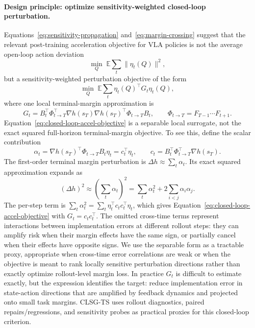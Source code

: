 \documentclass[10pt]{article}
\begin{document}
\paragraph{Design principle: optimize sensitivity-weighted closed-loop perturbation.}
Equations~\ref{eq:sensitivity-propagation} and~\ref{eq:margin-crossing} suggest that the relevant post-training acceleration objective for VLA policies is not the average open-loop action deviation
\begin{equation}
    \min_Q \; \mathbb{E}\sum_t \|\eta_t(Q)\|^2 ,
    \label{eq:open-loop-accel-objective}
\end{equation}
but a sensitivity-weighted perturbation objective of the form
\begin{equation}
    \min_Q \; \mathbb{E}\sum_t \eta_t(Q)^\top G_t \eta_t(Q),
    \label{eq:closed-loop-accel-objective}
\end{equation}
where one local terminal-margin approximation is
\begin{equation}
    G_t =
    B_t^\top \Phi_{t\to T}^\top
    \nabla h(s_T)\nabla h(s_T)^\top
    \Phi_{t\to T} B_t ,
    \qquad
    \Phi_{t\to T}=F_{T-1}\cdots F_{t+1}.
    \label{eq:sensitivity-metric}
\end{equation}
Equation~\ref{eq:closed-loop-accel-objective} is a separable local surrogate, not the exact squared full-horizon terminal-margin objective. To see this, define the scalar contribution
\[
    \alpha_t =
    \nabla h(s_T)^\top \Phi_{t\to T}B_t\eta_t
    =
    c_t^\top \eta_t,
    \qquad
    c_t = B_t^\top \Phi_{t\to T}^\top \nabla h(s_T).
\]
The first-order terminal margin perturbation is $\Delta h \approx \sum_t \alpha_t$. Its exact squared approximation expands as
\[
    (\Delta h)^2
    \approx
    \left(\sum_t \alpha_t\right)^2
    =
    \sum_t \alpha_t^2
    +
    2\sum_{i<j}\alpha_i\alpha_j .
\]
The per-step term is $\sum_t \alpha_t^2=\sum_t \eta_t^\top c_tc_t^\top\eta_t$, which gives Equation~\ref{eq:closed-loop-accel-objective} with $G_t=c_tc_t^\top$. The omitted cross-time terms represent interactions between implementation errors at different rollout steps: they can amplify risk when their margin effects have the same sign, or partially cancel when their effects have opposite signs. We use the separable form as a tractable proxy, appropriate when cross-time error correlations are weak or when the objective is meant to rank locally sensitive perturbation directions rather than exactly optimize rollout-level margin loss.
In practice $G_t$ is difficult to estimate exactly, but the expression identifies the target: reduce implementation error in state-action directions that are amplified by feedback dynamics and projected onto small task margins. CLSG-TS uses rollout diagnostics, paired repairs/regressions, and sensitivity probes as practical proxies for this closed-loop criterion.
\end{document}
